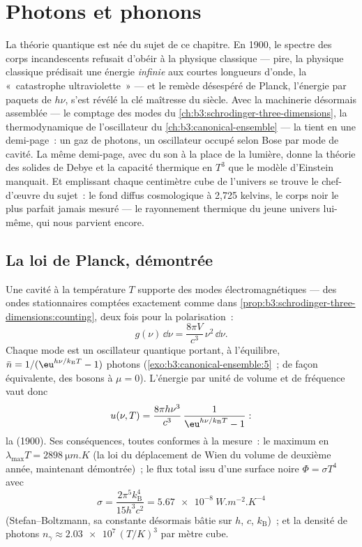 \chapter{Photons et phonons}\label{ch:b3:photons-phonons}

La théorie quantique est née du sujet de ce chapitre. En 1900, le
spectre des corps incandescents refusait d'obéir à la physique
classique --- pire, la physique classique prédisait une énergie
\emph{infinie} aux courtes longueurs d'onde, la «~catastrophe
ultraviolette~» --- et le remède désespéré de Planck, l'énergie par
paquets de $h\nu$, s'est révélé la clé maîtresse du siècle. Avec la
machinerie désormais assemblée --- le comptage des modes du
\cref{ch:b3:schrodinger-three-dimensions}, la thermodynamique de
l'oscillateur du \cref{ch:b3:canonical-ensemble} --- la 
tient en une demi-page~: un gaz de photons, un oscillateur occupé
selon Bose par mode de cavité. La même demi-page, avec du son à la
place de la lumière, donne la théorie des solides de Debye et la
capacité thermique en $T^3$ que le modèle d'Einstein manquait. Et
emplissant chaque centimètre cube de l'univers se trouve le
chef-d'œuvre du sujet~: le fond diffus cosmologique à 2,725 kelvins,
le corps noir le plus parfait jamais mesuré --- le rayonnement
thermique du jeune univers lui-même, qui nous parvient encore.

\section{La loi de Planck, démontrée}

\begin{theorem}\label{thm:b3:photons-phonons:planck}
Une cavité à la température $T$ supporte des modes
électromagnétiques --- des ondes stationnaires comptées exactement
comme dans \cref{prop:b3:schrodinger-three-dimensions:counting}, deux
fois pour la polarisation~:
\[
g(\nu)\,\dd\nu = \frac{8\pi V}{c^3}\,\nu^2\,\dd\nu .
\]
Chaque mode est un oscillateur quantique portant, à l'équilibre,
$\bar n = 1/(\eu^{h\nu/k_{\text{B}}T} - 1)$ photons
(\cref{exo:b3:canonical-ensemble:5}~; de façon équivalente, des bosons à $\mu =
0$). L'énergie par unité de volume et de fréquence vaut donc
\[
u(\nu, T) = \frac{8\pi h\nu^3}{c^3}\,
\frac{1}{\eu^{h\nu/k_{\text{B}}T} - 1} :
\]
la \emph{} (1900). Ses conséquences, toutes conformes à
la mesure~: le maximum en $\lambda_{\max}T = \qty{2898}{\micro m.K}$
(la loi du déplacement de Wien du volume de deuxième année,
maintenant démontrée)~; le flux total issu d'une surface noire
$\Phi = \sigma T^4$ avec
\[
\sigma = \frac{2\pi^5k_{\text{B}}^4}{15h^3c^2}
 = \qty{5.67e-8}{W.m^{-2}.K^{-4}}
\]
(Stefan--Boltzmann, sa constante désormais bâtie sur $h$, $c$,
$k_{\text{B}}$)~; et la densité de photons $n_\gamma \approx
\num{2.03e7}\,(T/\unit{K})^3$ par mètre cube.
\end{theorem}

